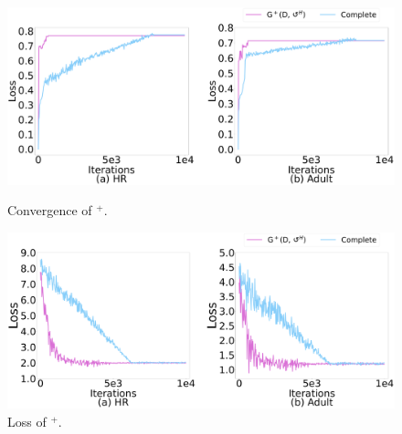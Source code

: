\begin{figure}[t]   
	\centering
	\begin{minipage}[t]{0.49\textwidth}
		\centering
		\includegraphics[width=\columnwidth]{figs/G+_a}
		\caption{Convergence of \ours$^+$.}
		\label{fig:converge_G+}
	\end{minipage}
	\begin{minipage}[t]{0.49\textwidth}
		\centering
		\includegraphics[width=\columnwidth]{figs/G+}
		\caption{Loss of \ours$^+$.}
		\label{fig:real_loss_G+}
	\end{minipage}
	\vspace*{-1em}   
\end{figure}



